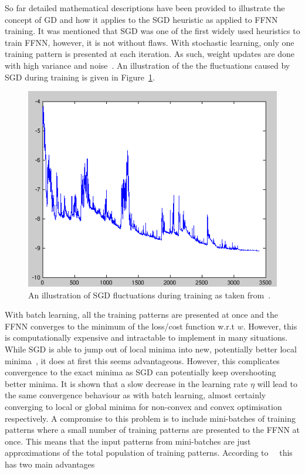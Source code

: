 So far detailed mathematical descriptions have been provided to illustrate the concept of \ac{GD} and how it applies to the \acs{SGD} heuristic as applied to \ac{FFNN} training. It was mentioned that \ac{SGD} was one of the first widely used heuristics to train \ac{FFNN}, however, it is not without flaws. With stochastic learning, only one training pattern is presented at each iteration. As such, weight updates are done with high variance and noise~\cite{ref:ruder:2016}. An illustration of the the fluctuations caused by \ac{SGD} during training is given in Figure~\ref{fig:heuristics:gd:sgd}.

\begin{figure}[htbp]
      \includegraphics[width=\textwidth]{images/sgd.png}
      \caption{An illustration of \ac{SGD} fluctuations during training as taken from~\cite{ref:sgd:2006}.}
      \label{fig:heuristics:gd:sgd}
\end{figure}

With batch learning, all the training patterns are presented at once and the \acs{FFNN} converges to the minimum of the loss/cost function w.r.t $w$. However, this is computationally expensive and intractable to implement in many situations. While \ac{SGD} is able to jump out of local minima into new, potentially better local minima~\cite{ref:ruder:2016}, it does at first this seems advantageous. However, this complicates convergence to the exact minima as \ac{SGD} can potentially keep overshooting better minima. It is shown that a slow decrease in the learning rate $\eta$ will lead to the same convergence behaviour as with batch learning, almost certainly converging to local or global minima for non-convex and convex optimisation respectively. A compromise to this problem is to include mini-batches of training patterns where a small number of training patterns are presented to the \acs{FFNN} at once. This means that the input patterns from mini-batches are just approximations of the total population of training patterns. According to~\citeauthor{ref:ruder:2016}~\cite{ref:ruder:2016} this has two main advantages

